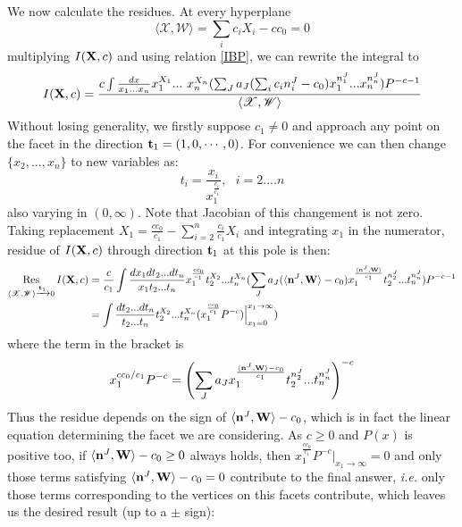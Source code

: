 \documentclass[12pt]{article}
\theoremstyle{definition}
\theoremstyle{plain}
\begin{document}
We now calculate the residues. At every hyperplane
\begin{equation}
\langle {\mathscr X}, {\mathscr W}\rangle=\sum_i c_i X_i-cc_0=0
\end{equation}
multiplying $I({\bf X},c)$ and using relation \eqref{IBP}, we can rewrite the integral to
\begin{equation}
I({\bf X},c)=\frac{c\int \frac{dx}{x_1...x_n} x_1^{X_1}...\ x_n^{X_n}(\sum_J a_J(\sum_ic_in^J_i-c_0)x_1^{n^J_1}...x_n^{n^J_n})P^{-c-1}}{\langle {\mathscr X}, {\mathscr W}\rangle}
\end{equation} 
Without losing generality, we firstly suppose $c_1\neq 0$ and approach any point on the facet in the direction ${\bf t}_1=(1,0,\cdots,0)$. For convenience we can then change $\{x_2,...,x_n\}$ to new variables as:
\begin{equation}\label{change}
t_i=\frac{x_i}{x_1^{\frac{c_i}{c_1}}},\ \ \ i=2....n
\end{equation} 
also varying in $(0,\infty)$. Note that Jacobian of this changement is not zero. Taking replacement $X_1=\frac{cc_0}{c_1}-\sum_{i=2}^n\frac{c_i}{c_1} X_i$ and integrating $x_1$ in the numerator, residue of $I({\bf X},c)$ through direction ${\bf t}_1$ at this pole is then:
\begin{equation}
\begin{split}
\operatorname*{Res}_{\langle {\mathscr X}, {\mathscr W}\rangle\xrightarrow{{\bf t}_1}0}I({\bf X},c)&=\frac{c}{c_1}\int \frac{dx_1dt_2...dt_n}{x_1t_2...t_n}x_1^{\frac{cc_0}{c_1}}t_2^{X_2}...t_n^{X_n}(\sum_J a_J(\langle{\bf n}^J,{\bf W}\rangle-c_0)x_1^{\frac{\langle{\bf n}^J,{\bf W}\rangle}{c_1}}t_2^{n^J_2}...t_n^{n^J_n})P^{-c-1}\\
&=\int \frac{dt_2...dt_n}{t_2...t_n}t_2^{X_2}...t_n^{X_n}(x_1^{\frac{cc_0}{c_1}}P^{-c})\Big|^{x_1\to \infty}_{x_1=0})
\end{split}
\end{equation}
where the term in the bracket is
\begin{equation}
x_1^{cc_0/c_1}P^{-c}=\left(\sum_J a_J x_1^{\frac{\langle{\bf n}^J,{\bf W}\rangle-c_0}{c_1}}t_2^{n^J_2}...t_n^{n^J_n}\right)^{-c}
\end{equation} 
Thus the residue depends on the sign of $\langle{\bf n}^J,{\bf W}\rangle-c_0$, which is in fact the linear equation determining the facet we are considering.  As $c\geq 0$ and $P(x)$ is positive too, if $\langle{\bf n}^J,{\bf W}\rangle-c_0\geq 0$  always holds, then $x_1^{\frac{cc_0}{c_1}}P^{-c}\Big|_{x_1\to \infty}=0$ and only those terms satisfying  $\langle{\bf n}^J,{\bf W}\rangle-c_0=0$ contribute to the final answer, {\it i.e.} only those terms corresponding to the vertices on this facets contribute, which leaves us the desired result (up to a $\pm$ sign):
\end{document}
